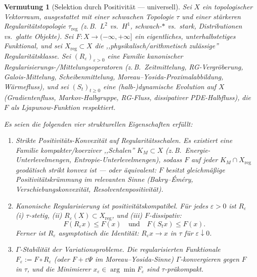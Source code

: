 \documentclass[12pt,a4paper]{article}
\newtheorem{conjecture}[theorem]{Vermutung}
\theoremstyle{definition}
\theoremstyle{remark}
\begin{document}
\begin{conjecture}[Selektion durch Positivit\"at --- universell]
\label{conj:selection-by-positivity}
Sei $X$ ein topologischer Vektorraum, ausgestattet mit einer schwachen Topologie $\tau$ und einer st\"arkeren Regularit\"atstopologie $\tau_{\mathrm{reg}}$ (z.\,B.\ $L^2$ vs.\ $H^1$, schwach-$*$ vs.\ stark, Distributionen vs.\ glatte Objekte). Sei $F: X \to (-\infty, +\infty]$ ein eigentliches, unterhalbstetiges Funktional, und sei $X_{\mathrm{reg}} \subset X$ die ,,physikalisch/arithmetisch zul\"assige'' Regularit\"atsklasse. Sei $(R_\varepsilon)_{\varepsilon > 0}$ eine Familie kanonischer Regularisierungs-/Mittelungsoperatoren (z.\,B.\ Zeitmittelung, RG-Vergr\"oberung, Galois-Mittelung, Scheibenmittelung, Moreau--Yosida-Proximalabbildung, W\"armefluss), und sei $(S_t)_{t \geq 0}$ eine (halb-)dynamische Evolution auf $X$ (Gradientenfluss, Markov-Halbgruppe, RG-Fluss, dissipativer PDE-Halbfluss), die $F$ als Ljapunow-Funktion respektiert.

Es seien die folgenden vier strukturellen Eigenschaften erf\"ullt:

\begin{enumerate}
\item[\textup{(SP1)}] \emph{Strikte Positivit\"ats-Konvexit\"at auf Regularit\"atsschalen.}
Es existiert eine Familie kompakter/koerziver ,,Schalen'' $K_M \subset X$ (z.\,B.\ Energie-Unterlevelmengen, Entropie-Unterlevelmengen), sodass $F$ auf jeder $K_M \cap X_{\mathrm{reg}}$ geod\"atisch strikt konvex ist --- oder \"aquivalent: $F$ besitzt gleichm\"a\ss ige Positivit\"atskr\"ummung im relevanten Sinne (Bakry--\'Em\'ery, Verschiebungskonvexit\"at, Resolventenpositivit\"at).

\item[\textup{(SP2)}] \emph{Kanonische Regularisierung ist positivit\"atskompatibel.}
F\"ur jedes $\varepsilon > 0$ ist $R_\varepsilon$ (i) $\tau$-stetig, (ii) $R_\varepsilon(X) \subset X_{\mathrm{reg}}$, und (iii) $F$-dissipativ:
\[
F(R_\varepsilon x) \leq F(x) \quad \text{und} \quad F(S_t x) \leq F(x).
\]
Ferner ist $R_\varepsilon$ asymptotisch die Identit\"at: $R_\varepsilon x \to x$ in $\tau$ f\"ur $\varepsilon \downarrow 0$.

\item[\textup{(SP3)}] \emph{$\Gamma$-Stabilit\"at der Variationsprobleme.}
Die regularisierten Funktionale $F_\varepsilon := F \circ R_\varepsilon$ (oder $F + \varepsilon \Psi$ im Moreau--Yosida-Sinne) $\Gamma$-konvergieren gegen $F$ in $\tau$, und die Minimierer $x_\varepsilon \in \arg\min F_\varepsilon$ sind $\tau$-pr\"akompakt.


\end{enumerate}
\end{conjecture}
\end{document}
